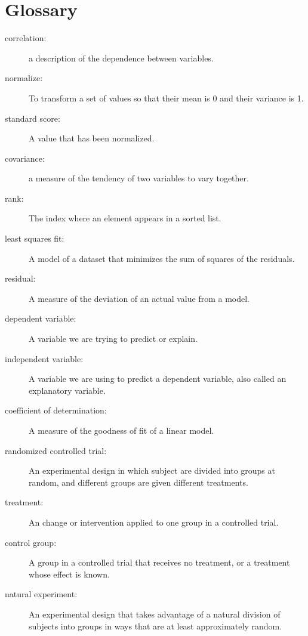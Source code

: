 \documentclass[12pt]{book}
\begin{document}




\section{Glossary}

\begin{description}

\item[correlation:] a description of the dependence between variables.

\item[normalize:] To transform a set of values so that their mean is 0 and
their variance is 1.

\item[standard score:] A value that has been normalized.

\item[covariance:] a measure of the tendency of two variables
to vary together.

\item[rank:] The index where an element appears in a sorted list.

\item[least squares fit:] A model of a dataset that minimizes the
sum of squares of the residuals.

\item[residual:] A measure of the deviation of an actual value from a model.

\item[dependent variable:] A variable we are trying to predict or explain.

\item[independent variable:] A variable we are using to predict a dependent
variable, also called an explanatory variable.

\item[coefficient of determination:] A measure of the goodness of fit
of a linear model.

\item[randomized controlled trial:] An experimental design in which subject
are divided into groups at random, and different groups are given different
treatments.

\item[treatment:] An change or intervention applied to one group in a
controlled trial.

\item[control group:] A group in a controlled trial that receives no
treatment, or a treatment whose effect is known.

\item[natural experiment:] An experimental design that takes advantage of
a natural division of subjects into groups in ways that are at least
approximately random.

\end{description}





\clearemptydoublepage
\end{document}
